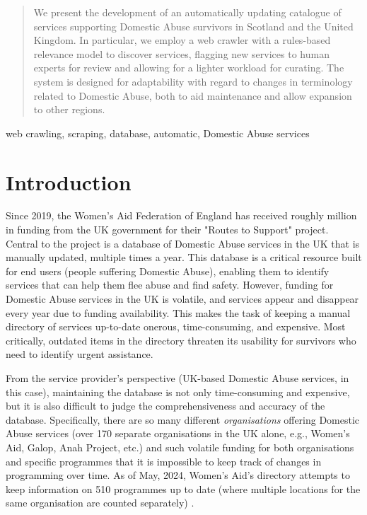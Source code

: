 \documentclass[conference]{IEEEtran}
\begin{document}
\maketitle

\begin{abstract}
We present the development of an automatically updating catalogue of services supporting Domestic Abuse survivors in Scotland and the United Kingdom. 
In particular, we employ a web crawler with a rules-based relevance model to discover services, flagging new services to human experts for review and allowing for a lighter workload for curating.
The system is designed for adaptability with regard to changes in terminology related to Domestic Abuse, both to aid maintenance and allow expansion to other regions.
\end{abstract}

\begin{IEEEkeywords}
web crawling, scraping, database, automatic, Domestic Abuse services
\end{IEEEkeywords}

\section{Introduction}

Since 2019, the Women's Aid Federation of England has received roughly  million in funding from the UK government for their "Routes to Support" project\cite{wafin20, wafin21, wafin22}.
Central to the project is a database of Domestic Abuse services in the UK that is manually updated, multiple times a year. 
This database is a critical resource built for end users (people suffering Domestic Abuse), enabling them to identify services that can help them flee abuse and find safety. 
However, funding for Domestic Abuse services in the UK is volatile, and services appear and disappear every year due to funding availability. 
This makes the task of keeping a manual directory of services up-to-date onerous, time-consuming, and expensive. 
Most critically, outdated items in the directory threaten its usability for survivors who need to identify urgent assistance.

From the service provider's perspective (UK-based Domestic Abuse services, in this case), maintaining the database is not only time-consuming and expensive, but it is also difficult to judge the comprehensiveness and accuracy of the database. 
Specifically, there are so many different \textit{organisations} offering Domestic Abuse services (over 170 separate organisations in the UK alone, e.g., Women's Aid, Galop, Anah Project, etc.) and such volatile funding for both organisations and specific programmes that it is impossible to keep track of changes in programming over time. 
As of May, 2024, Women's Aid's directory attempts to keep information on 510 programmes up to date (where multiple locations for the same organisation are counted separately) \cite{wadir}.
\end{document}
